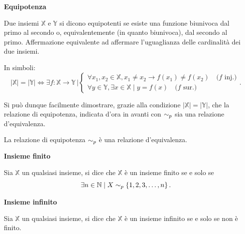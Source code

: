 \begin{definition}
    \textbf{Equipotenza}

    Due insiemi $\mathbb{X}$ e $\mathbb{Y}$ si dicono equipotenti se esiste una funzione
    biunivoca dal primo al secondo o, equivalentemente (in quanto biunivoca),
    dal secondo al primo. Affermazione equivalente ad affermare l'uguaglianza delle
    cardinalità dei due insiemi.
    
    In simboli:
    \[
        \left|\mathbb{X}\right| = \left|\mathbb{Y}\right| \Leftrightarrow
        \exists f:\mathbb{X}\rightarrow\mathbb{Y}\,\big|
        \begin{cases}
            \forall x_1, x_2 \in\mathbb{X}, x_1\neq x_2 \rightarrow f\left(x_1\right)\neq f\left(x_2\right) \quad \text{($f$ inj.)}\\
            \forall y \in\mathbb{Y}, \exists x\in\mathbb{X} \mid y=f\left(x\right) \quad \text{($f$ sur.)}
        \end{cases}.
    \]
\end{definition}

Si può dunque facilmente dimostrare, grazie alla condizione
$\left|\mathbb{X}\right| = \left|\mathbb{Y}\right|$, che la relazione di equipotenza, indicata
d'ora in avanti con $\sim_p$ sia una relazione d'equivalenza.

\begin{proposition}
    La relazione di equipotenza $\sim_p$ è una relazione d'equivalenza.
\end{proposition}

\begin{definition}
    \textbf{Insieme finito}

    Sia $\mathbb{X}$ un qualsiasi insieme, si dice che $\mathbb{X}$ è un insieme finito
    se e solo se
    \[
        \exists n \in\mathbb{N} \mid X\sim_p\left\{1,2,3,\ldots, n\right\}.
    \]
\end{definition}

\begin{definition}
    \textbf{Insieme infinito}

    Sia $\mathbb{X}$ un qualsiasi insieme, si dice che $\mathbb{X}$ è un insieme infinito
    se e solo se non è finito.
\end{definition}

